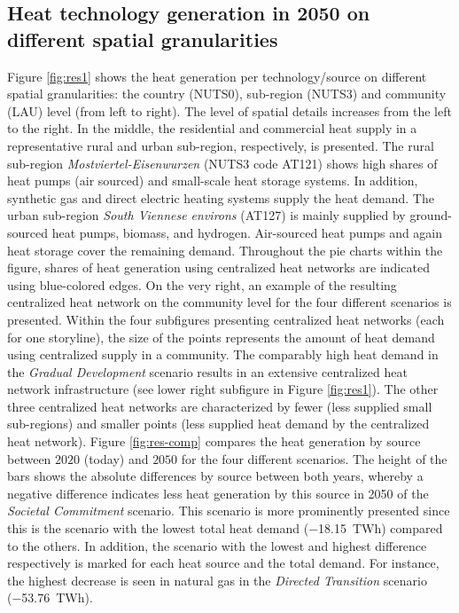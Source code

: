\subsection{Heat technology generation in 2050 on different spatial granularities}\label{res:2}
Figure \ref{fig:res1} shows the heat generation per technology/source on different spatial granularities: the country (NUTS0), sub-region (NUTS3) and community (LAU) level (from left to right). The level of spatial details increases from the left to the right. In the middle, the residential and commercial heat supply in a representative rural and urban sub-region, respectively, is presented. The rural sub-region \textit{Mostviertel-Eisenwurzen} (NUTS3 code AT121) shows high shares of heat pumps (air sourced) and small-scale heat storage systems. In addition, synthetic gas and direct electric heating systems supply the heat demand. The urban sub-region \textit{South Viennese environs} (AT127) is mainly supplied by ground-sourced heat pumps, biomass, and hydrogen. Air-sourced heat pumps and again heat storage cover the remaining demand. Throughout the pie charts within the figure, shares of heat generation using centralized heat networks are indicated using blue-colored edges. On the very right, an example of the resulting centralized heat network on the community level for the four different scenarios is presented. Within the four subfigures presenting centralized heat networks (each for one storyline), the size of the points represents the amount of heat demand using centralized supply in a community. The comparably high heat demand in the \textit{Gradual Development} scenario results in an extensive centralized heat network infrastructure (see lower right subfigure in Figure \ref{fig:res1}). The other three centralized heat networks are characterized by fewer (less supplied small sub-regions) and smaller points (less supplied heat demand by the centralized heat network). Figure \ref{fig:res-comp} compares the heat generation by source between $2020$ (today) and $2050$ for the four different scenarios. The height of the bars shows the absolute differences by source between both years, whereby a negative difference indicates less heat generation by this source in 2050 of the \textit{Societal Commitment} scenario. This scenario is more prominently presented since this is the scenario with the lowest total heat demand (\SI{-18.15}{TWh}) compared to the others. In addition, the scenario with the lowest and highest difference respectively is marked for each heat source and the total demand. For instance, the highest decrease is seen in natural gas in the \textit{Directed Transition} scenario (\SI{-53.76}{TWh}).

